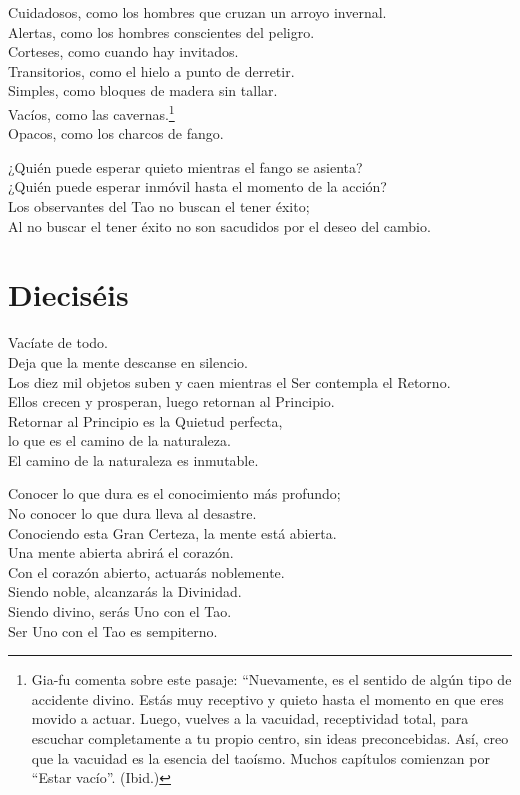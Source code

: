 \documentclass[hidelinks]{memoir}
\begin{document}
	Cuidadosos, como los hombres que cruzan un arroyo invernal.\\
	Alertas, como los hombres conscientes del peligro.\\
	Corteses, como cuando hay invitados.\\
	Transitorios, como el hielo a punto de derretir.\\
	Simples, como bloques de madera sin tallar.\\
	Vacíos, como las cavernas.\footnote{Gia-fu comenta sobre este pasaje: ``Nuevamente, es el sentido de algún
		tipo de accidente divino. Estás muy receptivo y quieto hasta el momento
		en que eres movido a actuar. Luego, vuelves a la vacuidad, receptividad
		total, para escuchar completamente a tu propio centro, sin ideas
		preconcebidas. Así, creo que la vacuidad es la esencia del taoísmo.
		Muchos capítulos comienzan por ``Estar vacío''. (Ibid.)}\\
	Opacos, como los charcos de fango.
	
	¿Quién puede esperar quieto mientras el fango se asienta?\\
	¿Quién puede esperar inmóvil hasta el momento de la acción?\\
	Los observantes del Tao no buscan el tener éxito;\\
	Al no buscar el tener éxito no son sacudidos por el deseo del cambio.
	
	\chapter*{Dieciséis}
	
	Vacíate de todo.\\
	Deja que la mente descanse en silencio.\\
	Los diez mil objetos suben y caen mientras el Ser contempla el
	Retorno.\\
	Ellos crecen y prosperan, luego retornan al Principio.\\
	Retornar al Principio es la Quietud perfecta,\\
	lo que es el camino de la naturaleza.\\
	El camino de la naturaleza es inmutable.
	
	Conocer lo que dura es el conocimiento más profundo;\\
	No conocer lo que dura lleva al desastre.\\
	Conociendo esta Gran Certeza, la mente está abierta.\\
	Una mente abierta abrirá el corazón.\\
	Con el corazón abierto, actuarás noblemente.\\
	Siendo noble, alcanzarás la Divinidad.\\
	Siendo divino, serás Uno con el Tao.\\
	Ser Uno con el Tao es sempiterno.
	
\end{document}
